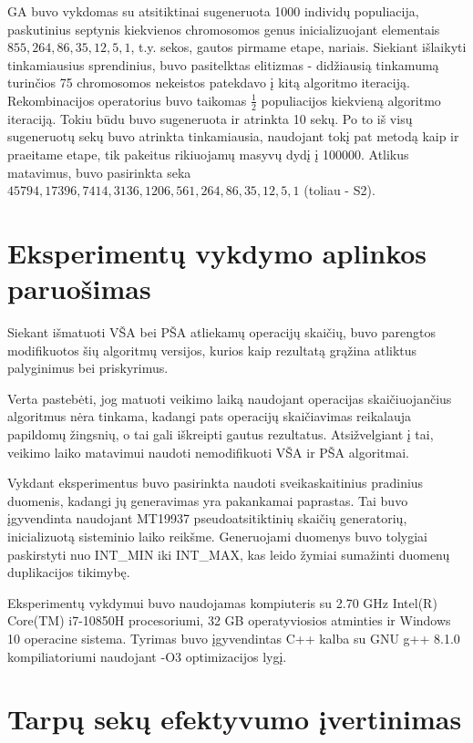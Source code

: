 \documentclass{VUMIFInfKursinis}
\begin{document}
GA buvo vykdomas su atsitiktinai sugeneruota 1000 individų populiacija,
paskutinius septynis kiekvienos chromosomos genus inicializuojant elementais $855, 264, 86, 35, 12, 5, 1$, t.y. sekos, gautos pirmame etape, nariais.
Siekiant išlaikyti tinkamiausius sprendinius, buvo pasitelktas elitizmas - didžiausią tinkamumą turinčios 75 chromosomos nekeistos
patekdavo į kitą algoritmo iteraciją.
Rekombinacijos operatorius buvo taikomas $\frac{1}{2}$ populiacijos kiekvieną algoritmo iteraciją.
Tokiu būdu buvo sugeneruota ir atrinkta 10 sekų.
Po to iš visų sugeneruotų sekų buvo atrinkta tinkamiausia, naudojant tokį pat metodą kaip ir praeitame etape, tik pakeitus rikiuojamų masyvų dydį į 100000.
Atlikus matavimus, buvo pasirinkta seka $45794, 17396, 7414, 3136, 1206, 561, 264, 86, 35, 12, 5, 1$ (toliau - S2).


\section{Eksperimentų vykdymo aplinkos paruošimas}

Siekant išmatuoti VŠA bei PŠA atliekamų operacijų skaičių,
buvo parengtos modifikuotos šių algoritmų versijos, kurios kaip rezultatą grąžina atliktus palyginimus bei priskyrimus.

Verta pastebėti, jog matuoti veikimo laiką naudojant operacijas skaičiuojančius algoritmus nėra tinkama,
kadangi pats operacijų skaičiavimas reikalauja papildomų žingsnių, o tai gali iškreipti gautus rezultatus.
Atsižvelgiant į tai, veikimo laiko matavimui naudoti nemodifikuoti VŠA ir PŠA algoritmai. 

Vykdant eksperimentus buvo pasirinkta naudoti sveikaskaitinius pradinius duomenis, kadangi jų generavimas yra pakankamai paprastas.
Tai buvo įgyvendinta naudojant MT19937 pseudoatsitiktinių skaičių generatorių, inicializuotą sisteminio laiko reikšme.
Generuojami duomenys buvo tolygiai paskirstyti nuo INT\_MIN iki INT\_MAX, kas leido žymiai sumažinti duomenų duplikacijos tikimybę.

Eksperimentų vykdymui buvo naudojamas kompiuteris su 2.70 GHz Intel(R) Core(TM) i7-10850H procesoriumi,
32 GB operatyviosios atminties ir Windows 10 operacine sistema.
Tyrimas buvo įgyvendintas C++ kalba su GNU g++ 8.1.0 kompiliatoriumi naudojant -O3 optimizacijos lygį.

\section{Tarpų sekų efektyvumo įvertinimas}
\end{document}
